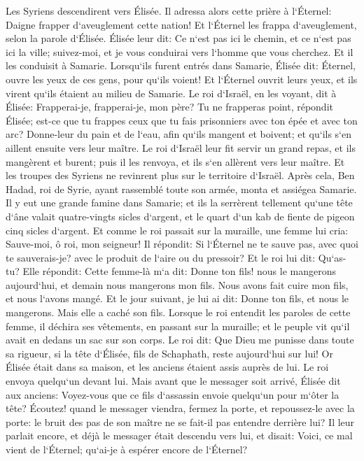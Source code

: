 \verse Les Syriens descendirent vers Élisée. Il adressa alors cette prière à l`Éternel: Daigne frapper d`aveuglement cette nation! Et l`Éternel les frappa d`aveuglement, selon la parole d`Élisée. 
\verse Élisée leur dit: Ce n`est pas ici le chemin, et ce n`est pas ici la ville; suivez-moi, et je vous conduirai vers l`homme que vous cherchez. Et il les conduisit à Samarie. 
\verse Lorsqu`ils furent entrés dans Samarie, Élisée dit: Éternel, ouvre les yeux de ces gens, pour qu`ils voient! Et l`Éternel ouvrit leurs yeux, et ils virent qu`ils étaient au milieu de Samarie. 
\verse Le roi d`Israël, en les voyant, dit à Élisée: Frapperai-je, frapperai-je, mon père? 
\verse Tu ne frapperas point, répondit Élisée; est-ce que tu frappes ceux que tu fais prisonniers avec ton épée et avec ton arc? Donne-leur du pain et de l`eau, afin qu`ils mangent et boivent; et qu`ils s`en aillent ensuite vers leur maître. 
\verse Le roi d`Israël leur fit servir un grand repas, et ils mangèrent et burent; puis il les renvoya, et ils s`en allèrent vers leur maître. Et les troupes des Syriens ne revinrent plus sur le territoire d`Israël. 
\verse Après cela, Ben Hadad, roi de Syrie, ayant rassemblé toute son armée, monta et assiégea Samarie. 
\verse Il y eut une grande famine dans Samarie; et ils la serrèrent tellement qu`une tête d`âne valait quatre-vingts sicles d`argent, et le quart d`un kab de fiente de pigeon cinq sicles d`argent. 
\verse Et comme le roi passait sur la muraille, une femme lui cria: Sauve-moi, ô roi, mon seigneur! 
\verse Il répondit: Si l`Éternel ne te sauve pas, avec quoi te sauverais-je? avec le produit de l`aire ou du pressoir? 
\verse Et le roi lui dit: Qu`as-tu? Elle répondit: Cette femme-là m`a dit: Donne ton fils! nous le mangerons aujourd`hui, et demain nous mangerons mon fils. 
\verse Nous avons fait cuire mon fils, et nous l`avons mangé. Et le jour suivant, je lui ai dit: Donne ton fils, et nous le mangerons. Mais elle a caché son fils. 
\verse Lorsque le roi entendit les paroles de cette femme, il déchira ses vêtements, en passant sur la muraille; et le peuple vit qu`il avait en dedans un sac sur son corps. 
\verse Le roi dit: Que Dieu me punisse dans toute sa rigueur, si la tête d`Élisée, fils de Schaphath, reste aujourd`hui sur lui! 
\verse Or Élisée était dans sa maison, et les anciens étaient assis auprès de lui. Le roi envoya quelqu`un devant lui. Mais avant que le messager soit arrivé, Élisée dit aux anciens: Voyez-vous que ce fils d`assassin envoie quelqu`un pour m`ôter la tête? Écoutez! quand le messager viendra, fermez la porte, et repoussez-le avec la porte: le bruit des pas de son maître ne se fait-il pas entendre derrière lui? 
\verse Il leur parlait encore, et déjà le messager était descendu vers lui, et disait: Voici, ce mal vient de l`Éternel; qu`ai-je à espérer encore de l`Éternel? 


